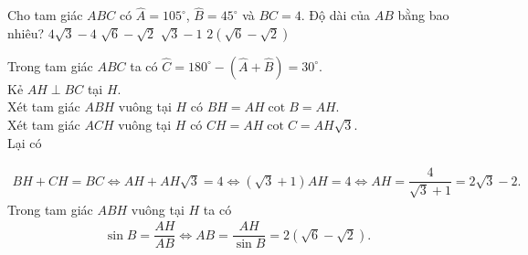 \begin{bt}%
	Cho tam giác $ABC$ có $\widehat{A}=105^\circ$, $\widehat{B}=45^\circ$ và $BC=4$. Độ dài của $AB$ bằng bao nhiêu?
	\choice
	{$4\sqrt{3}-4$}
	{$\sqrt{6}-\sqrt{2}$}
	{$\sqrt{3}-1$}
	{\True $2\left(\sqrt{6}-\sqrt{2}\right)$}
	\loigiai
	{
		\immini
		{
			Trong tam giác $ABC$ ta có $\widehat{C}=180^\circ-\left(\widehat{A}+\widehat{B}\right)=30^\circ$.\\
			Kẻ $AH\perp BC$ tại $H$.\\
			Xét tam giác $ABH$ vuông tại $H$ có $BH=AH\cot B=AH$.\\
			Xét tam giác $ACH$ vuông tại $H$ có $CH=AH\cot C=AH\sqrt{3}$.\\
			Lại có
		}
		{
		}
		\begin{eqnarray*}
			BH+CH=BC \Leftrightarrow AH+AH\sqrt{3}=4 \Leftrightarrow \left(\sqrt{3}+1\right)AH=4 \Leftrightarrow AH=\dfrac{4}{\sqrt{3}+1}=2\sqrt{3}-2.
		\end{eqnarray*}
		Trong tam giác $ABH$ vuông tại $H$ ta có
		\begin{eqnarray*}
			\sin B=\dfrac{AH}{AB} \Leftrightarrow AB=\dfrac{AH}{\sin B}=2\left(\sqrt{6}-\sqrt{2}\right).
		\end{eqnarray*}
	}
\end{bt}
